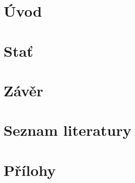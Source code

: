 \documentclass[12pt]{article}
\begin{document}



\newpage

\tableofcontents
\newpage

\section{Úvod}

\section{Stať}

\section{Závěr}

\section*{Seznam literatury}

\section*{Přílohy}
\end{document}
